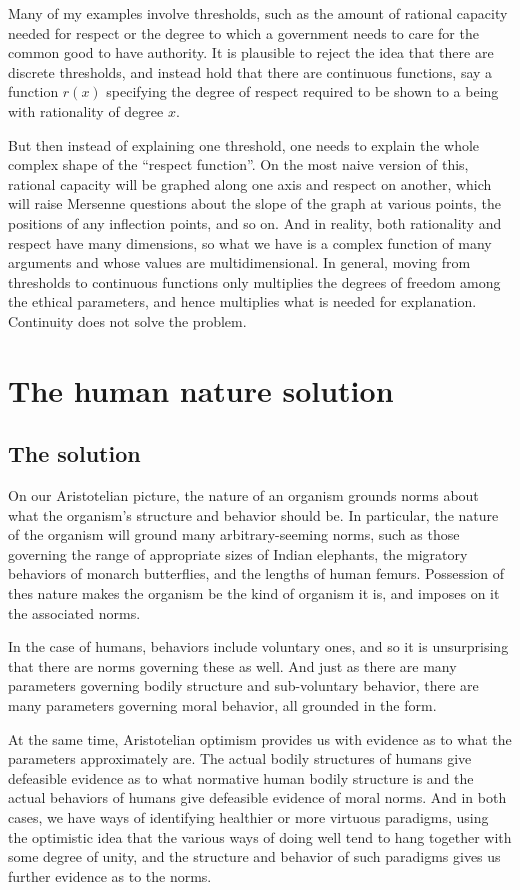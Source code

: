 Many of my examples involve thresholds, such as the amount of rational capacity needed for respect or the degree to which a government
needs to care for the common good to have authority. It is plausible to reject the idea that there are discrete thresholds, and instead hold 
that there are continuous functions, say a function $r(x)$ specifying the degree of respect required to be shown to a being with rationality
of degree $x$. 

But then instead of explaining one threshold, one needs to
explain the whole complex shape of the ``respect function''. On the most naive version of this, rational capacity will be graphed along one axis
and respect on another, which will raise Mersenne questions about the slope of the graph at various points, the positions of any inflection points, and so on. 
And in reality, both rationality and respect have many dimensions, so what we have is a complex function of many arguments and whose
values are multidimensional. In general, moving from thresholds to continuous functions only multiplies the degrees of freedom
among the ethical parameters, and hence multiplies what is needed for explanation. Continuity does not solve the problem.

\section{The human nature solution}
\subsection{The solution}
On our Aristotelian picture, the nature of an organism grounds norms about what the organism's structure and behavior 
should be. In particular, the nature of the organism will ground many arbitrary-seeming norms, such as those governing
the range of appropriate sizes of Indian elephants, the migratory behaviors of monarch butterflies, and the lengths of 
human femurs. Possession of thes nature makes the organism be the kind of organism it is, and imposes on it the associated norms.

In the case of humans, behaviors include voluntary ones, and so it is unsurprising that there are norms governing these
as well. And just as there are many parameters governing bodily structure and sub-voluntary behavior, there are many parameters
governing moral behavior, all grounded in the form. 

At the same time, Aristotelian optimism provides us with evidence as to what the parameters approximately are. The actual
bodily structures of humans give defeasible evidence as to what normative human bodily structure is and the actual behaviors
of humans give defeasible evidence of moral norms. And in both cases, we have ways of identifying healthier or more virtuous 
paradigms, using the optimistic idea that the various ways of doing well tend to hang together with some
degree of unity, and the structure and behavior of such paradigms gives us further evidence as to the norms.

